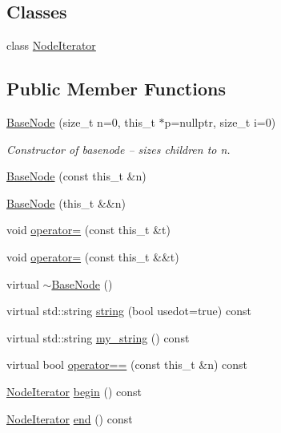 \subsection*{Classes}
\begin{DoxyCompactItemize}
\item 
class \hyperlink{class_base_node_1_1_node_iterator}{Node\+Iterator}
\end{DoxyCompactItemize}
\subsection*{Public Member Functions}
\begin{DoxyCompactItemize}
\item 
\hyperlink{class_base_node_ae6af9c22d332e9c3158d9467f77b59f7}{Base\+Node} (size\+\_\+t n=0, this\+\_\+t $\ast$p=nullptr, size\+\_\+t i=0)
\begin{DoxyCompactList}\small\item\em Constructor of basenode -- sizes children to n. \end{DoxyCompactList}\item 
\hyperlink{class_base_node_a4bad5d46ee19af54c1385771bb6c8380}{Base\+Node} (const this\+\_\+t \&n)
\item 
\hyperlink{class_base_node_ab42ef3f5a20566523577925ab0c2a911}{Base\+Node} (this\+\_\+t \&\&n)
\item 
void \hyperlink{class_base_node_a1a82f7670d09cdd2a7f12e00513b1d8f}{operator=} (const this\+\_\+t \&t)
\item 
void \hyperlink{class_base_node_adc129f52a6d44237b7e8c62c65f8332c}{operator=} (const this\+\_\+t \&\&t)
\item 
virtual \hyperlink{class_base_node_a2a33248b0eb051d7672691a73a38ff12}{$\sim$\+Base\+Node} ()
\item 
virtual std\+::string \hyperlink{class_base_node_a079dae7bec84f4de8eef6d6cb9368a22}{string} (bool usedot=true) const
\item 
virtual std\+::string \hyperlink{class_base_node_a263b93d5aaf1ce5eb7f103bf3b988db3}{my\+\_\+string} () const
\item 
virtual bool \hyperlink{class_base_node_a33bb5c59122f6b2778d39a0eaa0151d7}{operator==} (const this\+\_\+t \&n) const
\item 
\hyperlink{class_base_node_1_1_node_iterator}{Node\+Iterator} \hyperlink{class_base_node_ac735dd6fe296af4b8d2951cc6d9052c8}{begin} () const
\item 
\hyperlink{class_base_node_1_1_node_iterator}{Node\+Iterator} \hyperlink{class_base_node_a990f4bbfab3e8c78421e51f32cb5db48}{end} () const

\end{DoxyCompactItemize}
